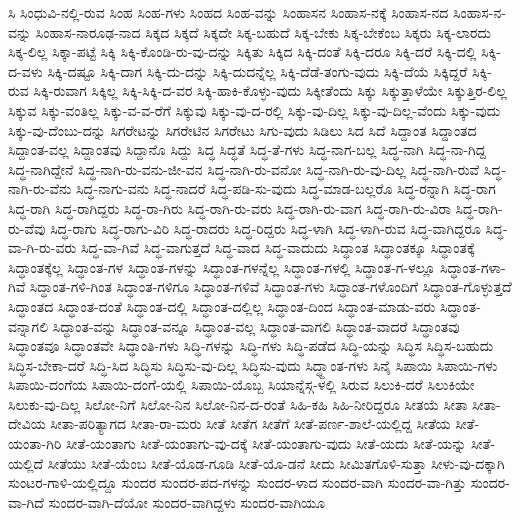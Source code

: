 {ಸಿ
ಸಿಂಧುವಿ-ನಲ್ಲಿ-ರುವ
ಸಿಂಹ
ಸಿಂಹ-ಗಳು
ಸಿಂಹದ
ಸಿಂಹ-ವನ್ನು
ಸಿಂಹಾಸನ
ಸಿಂಹಾಸ-ನಕ್ಕೆ
ಸಿಂಹಾಸ-ನದ
ಸಿಂಹಾಸ-ನ-ವನ್ನು
ಸಿಂಹಾಸ-ನಾರೂಢ-ನಾದ
ಸಿಕ್ಕದ
ಸಿಕ್ಕದೆ
ಸಿಕ್ಕದೇ
ಸಿಕ್ಕ-ಬಹುದೆ
ಸಿಕ್ಕ-ಬೇಕು
ಸಿಕ್ಕ-ಬೇಕೆಂಬ
ಸಿಕ್ಕರು
ಸಿಕ್ಕ-ಲಾರದು
ಸಿಕ್ಕ-ಲಿಲ್ಲ
ಸಿಕ್ಕಾ-ಪಟ್ಟೆ
ಸಿಕ್ಕಿ
ಸಿಕ್ಕಿ-ಕೊಂಡಿ-ರು-ವು-ದನ್ನು
ಸಿಕ್ಕಿತು
ಸಿಕ್ಕಿದ
ಸಿಕ್ಕಿ-ದಂತೆ
ಸಿಕ್ಕಿ-ದರೂ
ಸಿಕ್ಕಿ-ದರೆ
ಸಿಕ್ಕಿ-ದಲ್ಲಿ
ಸಿಕ್ಕಿ-ದ-ವಳು
ಸಿಕ್ಕಿ-ದಷ್ಟೂ
ಸಿಕ್ಕಿ-ದಾಗ
ಸಿಕ್ಕಿ-ದು-ದನ್ನು
ಸಿಕ್ಕಿ-ದುದನ್ನೆಲ್ಲ
ಸಿಕ್ಕಿ-ದೆಡೆ-ತಂಗು-ವುದು
ಸಿಕ್ಕಿ-ದೆಯೆ
ಸಿಕ್ಕಿದ್ದರೆ
ಸಿಕ್ಕಿ-ರುವ
ಸಿಕ್ಕಿ-ರುವಾಗ
ಸಿಕ್ಕಿಲ್ಲ
ಸಿಕ್ಕಿ-ಸಿಕ್ಕಿ-ದ-ವರ
ಸಿಕ್ಕಿ-ಹಾಕಿ-ಕೊಳ್ಳು-ವುದು
ಸಿಕ್ಕೀತೆಂದು
ಸಿಕ್ಕು
ಸಿಕ್ಕುತ್ತಾಳೆಯೇ
ಸಿಕ್ಕುತ್ತಿರ-ಲಿಲ್ಲ
ಸಿಕ್ಕುವ
ಸಿಕ್ಕು-ವಂತಿಲ್ಲ
ಸಿಕ್ಕು-ವ-ವ-ರೆಗೆ
ಸಿಕ್ಕುವು
ಸಿಕ್ಕು-ವು-ದ-ರಲ್ಲಿ
ಸಿಕ್ಕು-ವು-ದಿಲ್ಲ
ಸಿಕ್ಕು-ವು-ದಿಲ್ಲ-ವೆಂದು
ಸಿಕ್ಕು-ವುದು
ಸಿಕ್ಕು-ವು-ದೆಂಬು-ದನ್ನು
ಸಿಗರೇಟನ್ನು
ಸಿಗರೇಟಿನ
ಸಿಗರೇಟು
ಸಿಗು-ವುದು
ಸಿಡಿಲು
ಸಿದ
ಸಿದೆ
ಸಿದ್ದಾಂತ
ಸಿದ್ದಾಂತದ
ಸಿದ್ದಾಂತ-ವಲ್ಲ
ಸಿದ್ದಾಂತವು
ಸಿದ್ದಾನೊ
ಸಿದ್ದು
ಸಿದ್ಧ
ಸಿದ್ಧತೆ
ಸಿದ್ಧ-ತೆ-ಗಳು
ಸಿದ್ಧ-ನಾಗ-ಬಲ್ಲ
ಸಿದ್ಧ-ನಾಗಿ
ಸಿದ್ಧ-ನಾ-ಗಿದ್ದ
ಸಿದ್ಧ-ನಾಗಿದ್ದೇನೆ
ಸಿದ್ಧ-ನಾಗಿ-ರು-ವನು-ಜೀ-ವನ
ಸಿದ್ಧ-ನಾಗಿ-ರು-ವನೋ
ಸಿದ್ಧ-ನಾಗಿ-ರು-ವು-ದಿಲ್ಲ
ಸಿದ್ಧ-ನಾಗಿ-ರುವೆ
ಸಿದ್ಧ-ನಾಗಿ-ರು-ವೆನು
ಸಿದ್ಧ-ನಾಗು-ವನು
ಸಿದ್ಧ-ನಾದರೆ
ಸಿದ್ಧ-ಪಡಿ-ಸು-ವುದು
ಸಿದ್ಧ-ಮಾಡ-ಬಲ್ಲರೊ
ಸಿದ್ಧ-ರನ್ನಾಗಿ
ಸಿದ್ಧ-ರಾಗ
ಸಿದ್ಧ-ರಾಗಿ
ಸಿದ್ಧ-ರಾಗಿದ್ದರು
ಸಿದ್ಧ-ರಾ-ಗಿರು
ಸಿದ್ಧ-ರಾಗಿ-ರು-ವರು
ಸಿದ್ಧ-ರಾಗಿ-ರು-ವಾಗ
ಸಿದ್ಧ-ರಾಗಿ-ರು-ವಿರಾ
ಸಿದ್ಧ-ರಾಗಿ-ರು-ವೆವು
ಸಿದ್ಧ-ರಾಗು
ಸಿದ್ಧ-ರಾಗು-ವಿರಿ
ಸಿದ್ಧ-ರಾದರು
ಸಿದ್ಧ-ರಿದ್ದರು
ಸಿದ್ಧ-ಳಾಗಿ
ಸಿದ್ಧ-ಳಾಗಿ-ರುವ
ಸಿದ್ಧ-ವಾಗಿದ್ದರೂ
ಸಿದ್ಧ-ವಾ-ಗಿ-ರು-ವರು
ಸಿದ್ಧ-ವಾ-ಗಿವೆ
ಸಿದ್ಧ-ವಾಗುತ್ತದೆ
ಸಿದ್ಧ-ವಾದ
ಸಿದ್ಧ-ವಾದುದು
ಸಿದ್ಧಾಂತ
ಸಿದ್ಧಾಂತಕ್ಕೂ
ಸಿದ್ಧಾಂತಕ್ಕೆ
ಸಿದ್ಧಾಂತಕ್ಕೆಲ್ಲ
ಸಿದ್ಧಾಂತ-ಗಳ
ಸಿದ್ಧಾಂತ-ಗಳನ್ನು
ಸಿದ್ಧಾಂತ-ಗಳನ್ನೆಲ್ಲ
ಸಿದ್ಧಾಂತ-ಗಳಲ್ಲಿ
ಸಿದ್ಧಾಂತ-ಗ-ಳಲ್ಲೂ
ಸಿದ್ಧಾಂತ-ಗಳಾ-ಗಿವೆ
ಸಿದ್ಧಾಂತ-ಗಳಿ-ಗಿಂತ
ಸಿದ್ಧಾಂತ-ಗಳಿಗೂ
ಸಿದ್ಧಾಂತ-ಗಳಿವೆ
ಸಿದ್ಧಾಂತ-ಗಳು
ಸಿದ್ಧಾಂತ-ಗಳೊಂದಿಗೆ
ಸಿದ್ಧಾಂತ-ಗೊಳ್ಳುತ್ತದೆ
ಸಿದ್ಧಾಂತದ
ಸಿದ್ಧಾಂತ-ದಂತೆ
ಸಿದ್ಧಾಂತ-ದಲ್ಲಿ
ಸಿದ್ಧಾಂತ-ದಲ್ಲಿಲ್ಲ
ಸಿದ್ಧಾಂತ-ದಿಂದ
ಸಿದ್ಧಾಂತ-ಮಾಡು-ವರು
ಸಿದ್ಧಾಂತ-ವನ್ನಾಗಲಿ
ಸಿದ್ಧಾಂತ-ವನ್ನು
ಸಿದ್ಧಾಂತ-ವನ್ನೂ
ಸಿದ್ಧಾಂತ-ವಲ್ಲ
ಸಿದ್ಧಾಂತ-ವಾಗಲಿ
ಸಿದ್ಧಾಂತ-ವಾದರೆ
ಸಿದ್ಧಾಂತವು
ಸಿದ್ಧಾಂತವೂ
ಸಿದ್ಧಾಂತವೇ
ಸಿದ್ಧಾಂತಿ-ಗಳು
ಸಿದ್ಧಿ-ಗಳನ್ನು
ಸಿದ್ಧಿ-ಗಳು
ಸಿದ್ಧಿ-ಪಡೆದ
ಸಿದ್ಧಿ-ಯನ್ನು
ಸಿದ್ಧಿಸ
ಸಿದ್ಧಿಸ-ಬಹುದು
ಸಿದ್ಧಿಸ-ಬೇಕಾ-ದರೆ
ಸಿದ್ಧಿ-ಸಿದ
ಸಿದ್ಧಿಸು
ಸಿದ್ಧಿಸು-ವು-ದಿಲ್ಲ
ಸಿದ್ಧಿಸು-ವುದು
ಸಿದ್ಧ್ದಾಂತ-ಗಳು
ಸಿನೈ
ಸಿಪಾಯಿ
ಸಿಪಾಯಿ-ಗಳು
ಸಿಪಾಯಿ-ದಂಗೆಯ
ಸಿಪಾಯಿ-ದಂಗೆ-ಯಲ್ಲಿ
ಸಿಪಾಯಿ-ಯೊಬ್ಬ
ಸಿಯಾನ್ನೆಸ್ಗ-ಳಲ್ಲಿ
ಸಿರುವ
ಸಿಲುಕಿ-ದರೆ
ಸಿಲುಕಿಯೇ
ಸಿಲುಕು-ವು-ದಿಲ್ಲ
ಸಿಲೋ-ನಿಗೆ
ಸಿಲೋ-ನಿನ
ಸಿಲೋ-ನಿನ-ದ-ರಂತೆ
ಸಿಹಿ-ಕಹಿ
ಸಿಹಿ-ನೀರಿದ್ದರೂ
ಸೀತಯೆ
ಸೀತಾ
ಸೀತಾ-ದೇವಿಯ
ಸೀತಾ-ಪರಿತ್ಯಾಗದ
ಸೀತಾ-ರಾ-ಮರು
ಸೀತೆ
ಸೀತೆಗ
ಸೀತೆಗೆ
ಸೀತೆ-ಪರ್ಣ-ಶಾಲೆ-ಯಲ್ಲಿದ್ದ
ಸೀತೆಯ
ಸೀತೆ-ಯಂತಾ-ಗಿರಿ
ಸೀತೆ-ಯಂತಾಗು
ಸೀತೆ-ಯಂತಾಗು-ವು-ದಕ್ಕೆ
ಸೀತೆ-ಯಂತಾಗು-ವುದು
ಸೀತೆ-ಯದು
ಸೀತೆ-ಯನ್ನು
ಸೀತೆ-ಯಲ್ಲಿದೆ
ಸೀತೆಯು
ಸೀತೆ-ಯೆಂಬ
ಸೀತೆ-ಯೊಡ-ಗೂಡಿ
ಸೀತೆ-ಯೊ-ಡನೆ
ಸೀದು
ಸೀಮಿತಗೊಳಿ-ಸುತ್ತಾ
ಸೀಳು-ವು-ದಕ್ಕಾಗಿ
ಸುಂಟರ-ಗಾಳಿ-ಯಲ್ಲಿದ್ದೂ
ಸುಂದರ
ಸುಂದರ-ಪದ-ಗಳನ್ನು
ಸುಂದರ-ಳಾದ
ಸುಂದರ-ವಾಗಿ
ಸುಂದರ-ವಾ-ಗಿತ್ತು
ಸುಂದರ-ವಾ-ಗಿದೆ
ಸುಂದರ-ವಾಗಿ-ದೆಯೋ
ಸುಂದರ-ವಾಗಿದ್ದಳು
ಸುಂದರ-ವಾಗಿಯೂ
}
